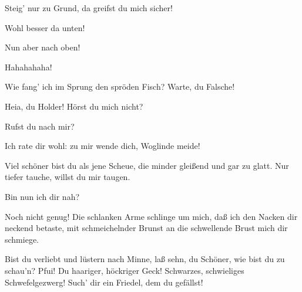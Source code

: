 \begin{drama}
\Woglindespeaks


Steig' nur zu Grund, da greifst du mich sicher!
 

\Alberichspeaks


Wohl besser da unten!
 

\Woglindespeaks


Nun aber nach oben!
 

Hahahahaha!
 

\Alberichspeaks
Wie fang' ich im Sprung den spröden Fisch?
Warte, du Falsche!
 




\Wellgundespeaks


Heia, du Holder! Hörst du mich nicht?
 

\Alberichspeaks


Rufst du nach mir?
 

\Wellgundespeaks
Ich rate dir wohl: zu mir wende dich,
Woglinde meide!
 

\Alberichspeaks


Viel schöner bist du als jene Scheue,
die minder gleißend und gar zu glatt.
Nur tiefer tauche, willst du mir taugen.
 

\Wellgundespeaks


Bin nun ich dir nah?
 

\Alberichspeaks
Noch nicht genug!
Die schlanken Arme schlinge um mich,
daß ich den Nacken dir neckend betaste,
mit schmeichelnder Brunst
an die schwellende Brust mich dir schmiege.
 

\Wellgundespeaks
Bist du verliebt und lüstern nach Minne,
laß sehn, du Schöner, wie bist du zu schau'n?
Pfui! Du haariger, höckriger Geck!
Schwarzes, schwieliges Schwefelgezwerg!
Such' dir ein Friedel, dem du gefällst!
 

\Alberichspeaks


\end{drama}

